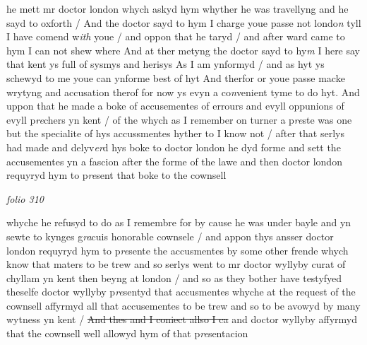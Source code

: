 \documentclass[12pt, a4paper]{book}
\begin{document}
he mett mr doctor london
			 whych askyd hym whyther he was travellyng
and he sayd to oxforth / And the doctor sayd to hym I charge youe passe not londo\textit{n}
tyll I have comend w\textit{ith} youe / and oppon that he taryd / and after ward came 
to hym I can not shew where And at ther metyng the doctor sayd to hy\textit{m}
I here say that kent ys full of sysmys and herisys As I am ynformyd / and
as hyt ys 
			schewyd to me youe can ynforme best of hyt And therfor or youe
passe macke wrytyng and accusation therof for now ys evyn a co\textit{n}venient 
tyme to do hyt. And uppon that he made a boke of accusementes of errours
and evyll oppunions of evyll p\textit{re}chers yn kent / of the whych as I remember
on 
			turner a p\textit{re}ste was one but the specialite of hys accussmentes hyther to I know
not / after that serlys had made and delyv\textit{er}d hys boke to doctor london he
dyd forme and sett the accusementes yn a fascion after the forme of the lawe
and then doctor london requyryd hym
			 to p\textit{re}sent that boke to the cownsell
			

\dotfill
						\newpage
{}

\textit{folio 310}



		\ifthenelse{\isodd{\thepage}}
		{\reversemarginpar}
		{\normalmarginpar}
		whyche he refusyd to do as I remembre for by cause he was under bayle
and yn sewte to kynges g\textit{ra}cuis honorable cownsele / and appon thys ansser
doctor london requyryd hym to p\textit{re}sente the accusmentes by some other frende
whych know that maters to be trew and so serlys went to mr doctor
wyllyby curat of chyllam yn kent then beyng at london / and so as they
bother have testyfyed theselfe doctor wyllyby p\textit{re}sentyd that accusmentes
whyche at the request of the cownsell affyrmyd all that accusementes 
to be trew and so to be avowyd by many wytness yn kent / \sout{And thes and I coniect allso I ca}
               and 
			doctor wyllyby affyrmyd that the cownsell well allowyd hym of that p\textit{re}sentacion 

			
\end{document}
